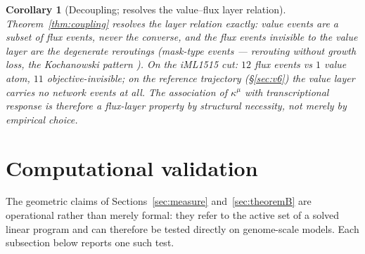 \documentclass[11pt,a4paper]{article}
\theoremstyle{plain}
\newtheorem{corollary}[theorem]{Corollary}
\theoremstyle{definition}
\theoremstyle{remark}
\newcommand{\kmu}{\kappa^{\mu}}
\begin{document}
\begin{corollary}[Decoupling; resolves the value--flux layer
relation]\label{cor:valueflux}
Theorem~\ref{thm:coupling} resolves the layer relation exactly: value
events are a subset of flux events, never the converse, and the flux
events invisible to the value layer are the degenerate reroutings
(mask-type events --- rerouting without growth loss, the Kochanowski pattern \citep{kochanowski2013}). On the iML1515 cut: $12$ flux events vs $1$ value atom, $11$ objective-invisible; on the reference trajectory (\S\ref{sec:v6}) the
value layer carries no network events at all. The association of
$\kmu$ with transcriptional response is therefore a flux-layer
property by structural necessity, not merely by empirical choice.
\end{corollary}

\section{Computational validation}\label{sec:computational}

The geometric claims of Sections~\ref{sec:measure}
and~\ref{sec:theoremB} are operational rather than merely formal: they
refer to the active set of a solved linear program and can therefore
be tested directly on genome-scale models. Each subsection below
reports one such test.
\end{document}
